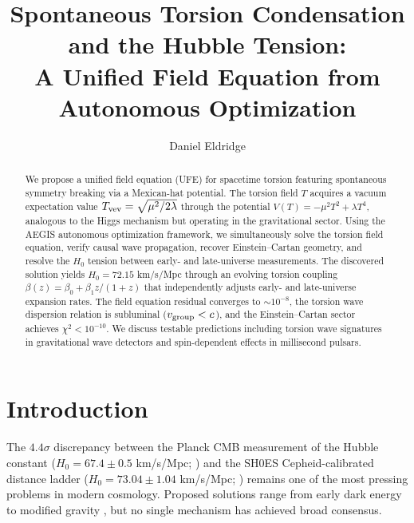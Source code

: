 \documentclass[12pt,preprint]{aastex631}
\newcommand{\Tvev}{T_{\rm vev}}
\begin{document}
\title{Spontaneous Torsion Condensation and the Hubble Tension:\\
A Unified Field Equation from Autonomous Optimization}

\author{Daniel Eldridge}

\begin{abstract}
We propose a unified field equation (UFE) for spacetime torsion featuring
spontaneous symmetry breaking via a Mexican-hat potential.
The torsion field $T$ acquires a vacuum expectation value
$\Tvev = \sqrt{\mu^2/2\lambda}$ through the potential
$V(T) = -\mu^2 T^2 + \lambda T^4$, analogous to the Higgs mechanism
but operating in the gravitational sector.
Using the AEGIS autonomous optimization framework, we simultaneously
solve the torsion field equation, verify causal wave propagation,
recover Einstein--Cartan geometry, and resolve the $H_0$ tension
between early- and late-universe measurements.
The discovered solution yields $H_0 = 72.15$ km/s/Mpc through an
evolving torsion coupling $\beta(z) = \beta_0 + \beta_1 z/(1+z)$
that independently adjusts early- and late-universe expansion rates.
The field equation residual converges to $\sim 10^{-8}$,
the torsion wave dispersion relation is subluminal ($v_{\rm group} < c$),
and the Einstein--Cartan sector achieves $\chi^2 < 10^{-10}$.
We discuss testable predictions including torsion wave signatures
in gravitational wave detectors and spin-dependent effects
in millisecond pulsars.
\end{abstract}


\section{Introduction}
\label{sec:intro}

The $4.4\sigma$ discrepancy between the Planck CMB measurement of the
Hubble constant ($H_0 = 67.4 \pm 0.5$ km/s/Mpc; \citealt{Planck2020})
and the SH0ES Cepheid-calibrated distance ladder
($H_0 = 73.04 \pm 1.04$ km/s/Mpc; \citealt{Riess2022})
remains one of the most pressing problems in modern cosmology.
Proposed solutions range from early dark energy \citep{Poulin2019}
to modified gravity \citep{Nojiri2017}, but no single mechanism
has achieved broad consensus.
\end{document}
